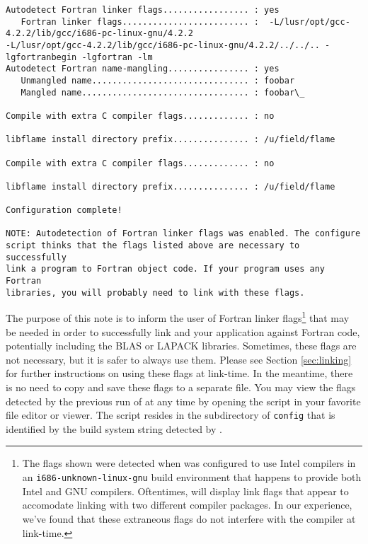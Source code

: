 \begin{Verbatim}[frame=single,framesep=2.5mm,xleftmargin=5mm,commandchars=\\\{\},fontsize=\footnotesize]
Autodetect Fortran linker flags................. : yes
   Fortran linker flags......................... :  -L/lusr/opt/gcc-4.2.2/lib/gcc/i686-pc-linux-gnu/4.2.2
-L/lusr/opt/gcc-4.2.2/lib/gcc/i686-pc-linux-gnu/4.2.2/../../.. -lgfortranbegin -lgfortran -lm
Autodetect Fortran name-mangling................ : yes
   Unmangled name............................... : foobar
   Mangled name................................. : foobar\_

Compile with extra C compiler flags............. : no

libflame install directory prefix............... : /u/field/flame

Compile with extra C compiler flags............. : no

libflame install directory prefix............... : /u/field/flame

Configuration complete!

NOTE: Autodetection of Fortran linker flags was enabled. The configure
script thinks that the flags listed above are necessary to successfully
link a program to Fortran object code. If your program uses any Fortran
libraries, you will probably need to link with these flags.
\end{Verbatim}

The purpose of this note is to inform the user of Fortran linker flags\footnote{
The flags shown were detected when \libflame was configured to use Intel
compilers in an {\tt i686-unknown-linux-gnu} build environment that
happens to provide both Intel and GNU compilers.
Oftentimes, \postconfigure will display link flags that appear to accomodate
linking with two different compiler packages.
In our experience, we've found that these extraneous flags do not interfere
with the compiler at link-time.
}
that may be needed in order
to successfully link \libflame and your application against Fortran code,
potentially including the BLAS or LAPACK libraries.
Sometimes, these flags are not necessary, but it is safer to always use them.
Please see Section \ref{sec:linking} for further instructions on using these
flags at link-time.
In the meantime, there is no need to copy and save these flags to a separate
file.
You may view the flags detected by the previous run of \configure at
any time by opening the \postconfigure script in your favorite file editor
or viewer.
The \postconfigure script resides in the subdirectory of {\tt config} that
is identified by the build system string detected by \configurens.

